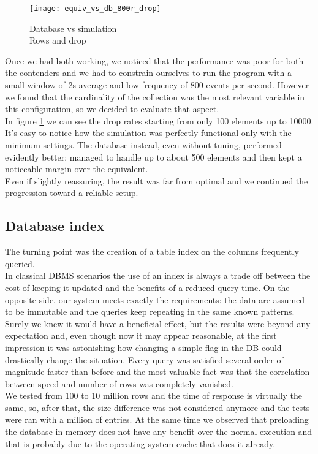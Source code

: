 \begin{figure}[h]
  \centering
  \texttt{[image: equiv\_vs\_db\_800r\_drop]}
  \caption{Database vs simulation\\
  Rows and drop}
  \label{fig:equiv_vs_db_800r_drop}
\end{figure}

Once we had both working, we noticed that the performance was poor for both the contenders and we had to constrain ourselves to run the program with a small window of 2s average and low frequency of 800 events per second. However we found that the cardinality of the collection was the most relevant variable in this configuration, so we decided to evaluate that aspect.\\
In figure \ref{fig:equiv_vs_db_800r_drop} we can see the drop rates starting from only 100 elements up to 10000. It's easy to notice how the simulation was perfectly functional only with the minimum settings. The database instead, even without tuning, performed evidently better: managed to handle up to about 500 elements and then kept a noticeable margin over the equivalent.\\
Even if slightly reassuring, the result was far from optimal and we continued the progression toward a reliable setup.

\subsection{Database index}
The turning point was the creation of a table index on the columns frequently queried.\\
In classical DBMS scenarios the use of an index is always a trade off between the cost of keeping it updated and the benefits of a reduced query time. On the opposite side, our system meets exactly the requirements: the data are assumed to be immutable and the queries keep repeating in the same known patterns.\\
Surely we knew it would have a beneficial effect, but the results were beyond any expectation and, even though now it may appear reasonable, at the first impression it was astonishing how changing a simple flag in the DB could drastically change the situation. Every query was satisfied several order of magnitude faster than before and the most valuable fact was that the correlation between speed and number of rows was completely vanished.\\
We tested from 100 to 10 million rows and the time of response is virtually the same, so, after that, the size difference was not considered anymore and the tests were ran with a million of entries. At the same time we observed that preloading the database in memory does not have any benefit over the normal execution and that is probably due to the operating system cache that does it already.

